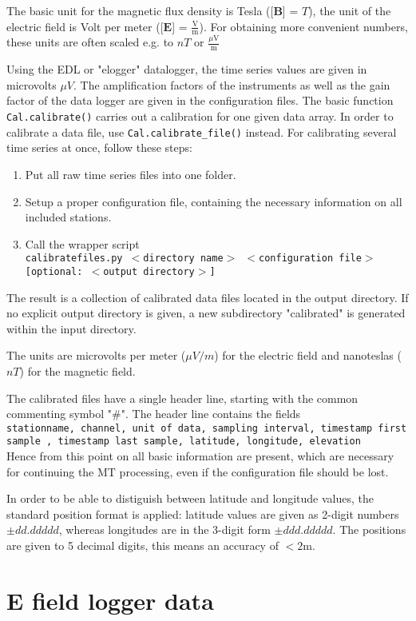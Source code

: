The basic unit for the magnetic flux density is Tesla ([$\mathbf{B}$] = $T$), the unit of the electric field is Volt per meter ([$\mathbf{E}$] = $\frac{\mbox{V}}{\mbox{m}}$). For obtaining more convenient numbers, these units are often scaled e.g. to $nT$ or $\frac{\mu\mbox{V}}{\mbox{m}}$

Using the EDL or "elogger" datalogger, the time series values are given in microvolts $\mu V$. The amplification factors of the instruments as well as the gain factor of the data logger are given in the configuration files.
The basic function \texttt{Cal.calibrate()} carries out a calibration for one given data array. In order to calibrate a data file, use  \texttt{Cal.calibrate\_file()} instead.
For calibrating several time series at once, follow these steps:
\begin{enumerate}
\item Put all raw time series files into one folder.
\item Setup a proper configuration file, containing the necessary information on all included stations.  
\item Call the wrapper script\\
\texttt{calibratefiles.py $<$directory name$>$ $<$configuration file$>$ [optional: $<$output directory$>$] }  
\end{enumerate}
The result is a collection of calibrated data files located in the output directory. 
If no explicit output directory is given, a new subdirectory "calibrated" is generated within the input directory. 

The units are microvolts per meter ($\mu V/m$) for the electric field and nanoteslas ($nT$) for the magnetic field.

The calibrated files have a single header line, starting with the common commenting symbol "\#".
The header line contains the fields\\
\texttt{stationname, channel, unit of data, sampling interval, timestamp first sample , timestamp last sample, latitude, longitude, elevation}\\
Hence from this point on all basic information are present, which are necessary for continuing the MT processing, even if the configuration file should be lost. 

In order to be able to distiguish between latitude and longitude values, the standard position format is applied: latitude values are given as  2-digit numbers $\pm dd.ddddd$, whereas longitudes are in the 3-digit form $\pm ddd.ddddd$. The positions are given to 5 decimal digits, this means an accuracy of $< 2$m.



\section{E field logger data}
\label{sec:processing.elogger}
